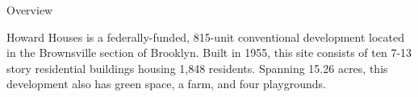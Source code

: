 Overview 

Howard Houses is a federally-funded, 815-unit conventional development located in the Brownsville section of Brooklyn. Built in 1955, this site consists of ten 7-13 story residential buildings housing 1,848 residents. Spanning 15.26 acres, this development also has green space, a farm, and four playgrounds. 
